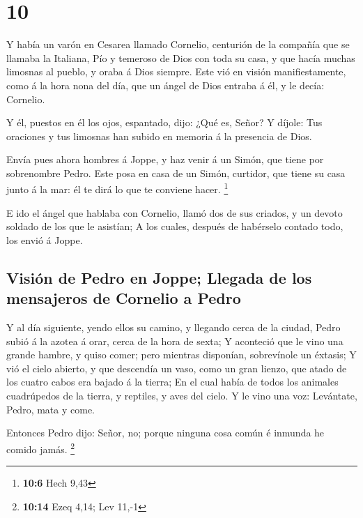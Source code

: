 \hypertarget{section-9}{%
\section{10}\label{section-9}}

 Y había un varón en Cesarea llamado Cornelio, centurión
de la compañía que se llamaba la Italiana,  Pío y temeroso
de Dios con toda su casa, y que hacía muchas limosnas al pueblo, y oraba
á Dios siempre.  Este vió en visión manifiestamente, como
á la hora nona del día, que un ángel de Dios entraba á él, y le decía:
Cornelio.

 Y él, puestos en él los ojos, espantado, dijo: ¿Qué es,
Señor? Y díjole: Tus oraciones y tus limosnas han subido en memoria á la
presencia de Dios.

 Envía pues ahora hombres á Joppe, y haz venir á un Simón,
que tiene por sobrenombre Pedro.  Este posa en casa de un
Simón, curtidor, que tiene su casa junto á la mar: él te dirá lo que te
conviene hacer. \footnote{\textbf{10:6} Hech 9,43}

 E ido el ángel que hablaba con Cornelio, llamó dos de sus
criados, y un devoto soldado de los que le asistían;  A
los cuales, después de habérselo contado todo, los envió á Joppe.

\hypertarget{visiuxf3n-de-pedro-en-joppe-llegada-de-los-mensajeros-de-cornelio-a-pedro}{%
\subsection{Visión de Pedro en Joppe; Llegada de los mensajeros de
Cornelio a
Pedro}\label{visiuxf3n-de-pedro-en-joppe-llegada-de-los-mensajeros-de-cornelio-a-pedro}}

 Y al día siguiente, yendo ellos su camino, y llegando
cerca de la ciudad, Pedro subió á la azotea á orar, cerca de la hora de
sexta;  Y aconteció que le vino una grande hambre, y
quiso comer; pero mientras disponían, sobrevínole un éxtasis;
 Y vió el cielo abierto, y que descendía un vaso, como un
gran lienzo, que atado de los cuatro cabos era bajado á la tierra;
 En el cual había de todos los animales cuadrúpedos de la
tierra, y reptiles, y aves del cielo.  Y le vino una voz:
Levántate, Pedro, mata y come.

 Entonces Pedro dijo: Señor, no; porque ninguna cosa
común é inmunda he comido jamás. \footnote{\textbf{10:14} Ezeq 4,14; Lev
  11,-1}

